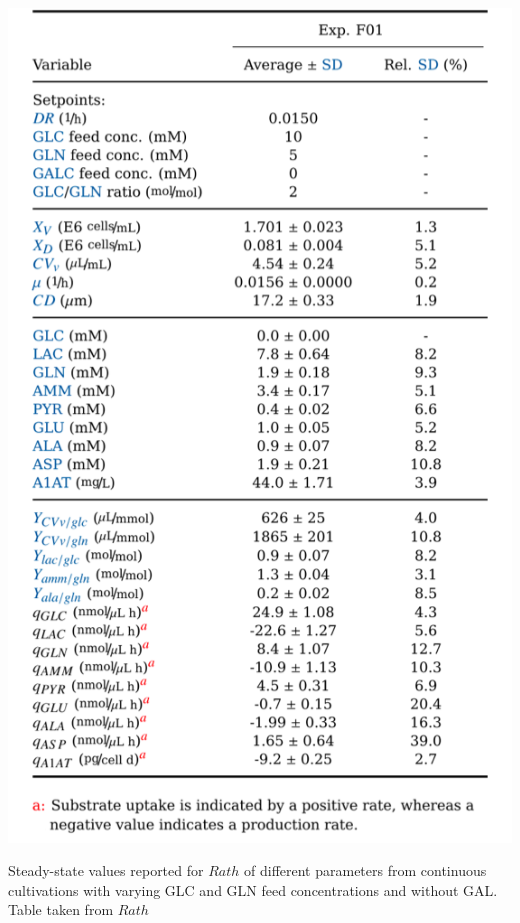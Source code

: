 \documentclass[]{article}
\begin{document}
 	\begin{table}
 		\centering
 		\includegraphics[scale = 0.8]{Table_4_12}
 		\caption{Steady-state values reported for $Rath$ of different parameters from continuous cultivations with varying GLC and GLN feed concentrations and without GAL. Table taken from $Rath$}
 	
 	\end{table}

		
\end{document}
